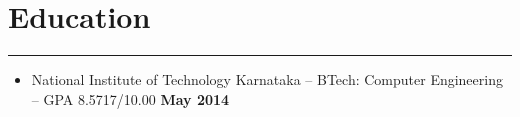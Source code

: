 \section*{Education}
\hrule
\vspace{0.3cm}
\begin{itemize}[label=\textperiodcentered,labelindent=0pt,itemindent=1em,leftmargin=0.3cm,itemsep=0pt]
    \item{National Institute of Technology Karnataka -- BTech: Computer Engineering -- GPA 8.5717/10.00 \hfill \textbf{\small{May 2014}}}
\end{itemize}